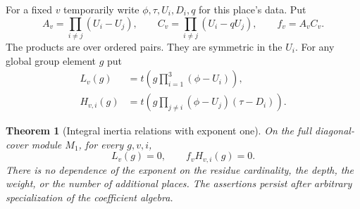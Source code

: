 \documentclass[a4paper,11pt]{article}
\newtheorem{theorem}[proposition]{Theorem}
\theoremstyle{definition}
\theoremstyle{remark}
\numberwithin{equation}{section}
\begin{document}
For a fixed \(v\) temporarily write \(\phi,\tau,U_i,D_i,q\)
for this place's data. Put
\[
 A_v=\prod_{i\ne j}(U_i-U_j),\qquad
 C_v=\prod_{i\ne j}(U_i-qU_j),\qquad f_v=A_v C_v .
\]
The products are over ordered pairs. They are symmetric in
the \(U_i\). For any global group element \(g\) put
\[
 \begin{split}
 L_v(g)&=t\!\left(g\prod_{i=1}^3(\phi-U_i)\right),\\
 H_{v,i}(g)&=t\!\left(g\prod_{j\ne i}(\phi-U_j)
                                  (\tau-D_i)\right).
 \end{split}
\]

\begin{theorem}[Integral inertia relations with exponent one]\leavevmode
\label{thm:inertiatrace406}
On the full diagonal-cover module \(M_1\), for every \(g,v,i\),
\[
                   L_v(g)=0,\qquad f_v H_{v,i}(g)=0 .
\]
There is no dependence of the exponent on the residue
cardinality, the depth, the weight, or the number of
additional places. The assertions persist after arbitrary
specialization of the coefficient algebra.
\end{theorem}
\end{document}
